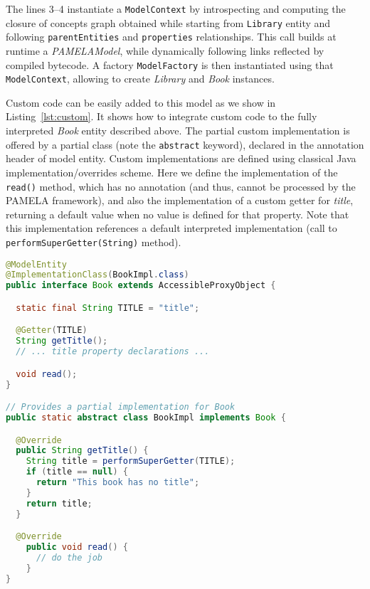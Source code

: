 The lines 3--4 instantiate a \texttt{ModelContext} by introspecting and computing the closure of concepts graph obtained while starting from \texttt{Library} entity and following \texttt{parentEntities} and \texttt{properties} relationships. This call builds at runtime a \emph{PAMELAModel}, while dynamically following links reflected by compiled bytecode. A factory \texttt{ModelFactory} is then instantiated using that \texttt{ModelContext}, allowing to create \emph{Library} and \emph{Book} instances.

Custom code can be easily added to this model as we show in Listing~\ref{lst:custom}. It shows how to integrate custom code to the fully interpreted \emph{Book} entity described above. The partial custom implementation is offered by a partial class (note the \texttt{abstract} keyword), declared in the annotation header of model entity. Custom implementations are defined using classical Java implementation/overrides scheme. Here we define the implementation of the \texttt{read()} method, which has no annotation (and thus, cannot be processed by the PAMELA framework), and also the implementation of a custom getter for \emph{title}, returning a default value when no value is defined for that property. Note that this implementation references a default interpreted implementation (call to \texttt{performSuperGetter(String)} method).

\begin{lstlisting}[language=Java,basicstyle=\ttfamily\footnotesize,caption=Custom Code, label=lst:custom]
@ModelEntity
@ImplementationClass(BookImpl.class)
public interface Book extends AccessibleProxyObject {

  static final String TITLE = "title";

  @Getter(TITLE)
  String getTitle();
  // ... title property declarations ...

  void read();
}

// Provides a partial implementation for Book
public static abstract class BookImpl implements Book {

  @Override
  public String getTitle() {
    String title = performSuperGetter(TITLE);
    if (title == null) {
      return "This book has no title";
    }
    return title;
  }

  @Override
    public void read() {
      // do the job
    }
}
\end{lstlisting}
